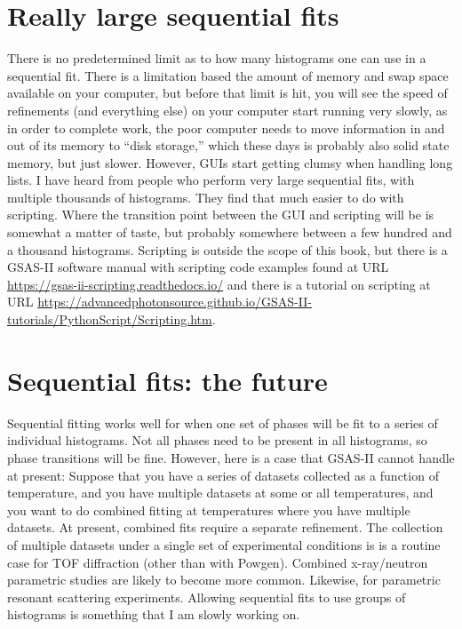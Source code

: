 \section{Really large sequential fits}
There is no predetermined limit as to how many histograms one can use in a sequential fit. There is a limitation based the amount of memory and swap space available on your computer, but before that limit is hit, you will see the speed of refinements (and everything else) on your computer start running very slowly, as in order to complete work, the poor computer needs to move information in and out of its memory to ``disk storage,'' which these days is probably also solid state memory, but just slower. However, GUIs start getting clumsy when handling long lists. I have heard from people who perform very large sequential fits, with multiple thousands of histograms. They find that much easier to do with scripting. Where the transition point between the GUI and scripting will be is somewhat a matter of taste, but probably somewhere between a few hundred and a thousand histograms. Scripting is outside the scope of this book, but there is a GSAS-II software manual with scripting code examples found at URL \url{https://gsas-ii-scripting.readthedocs.io/} and there is a tutorial on scripting at URL \url{https://advancedphotonsource.github.io/GSAS-II-tutorials/PythonScript/Scripting.htm}.

\section{Sequential fits: the future}
Sequential fitting works well for when one set of phases will be fit to a series of individual histograms. Not all phases need to be present in all histograms, so phase transitions will be fine. However, here is a case that GSAS-II cannot handle at present: Suppose that you have a series of datasets collected as a function of temperature, and you have multiple datasets at some or all temperatures, and you want to do combined fitting at temperatures where you have multiple datasets. At present, combined fits require a separate refinement. The collection of multiple datasets under a single set of experimental conditions is is a routine case for TOF diffraction (other than with Powgen). Combined x-ray/neutron parametric studies are likely to become more common. Likewise, for parametric resonant scattering experiments. Allowing sequential fits to use groups of histograms is something that I am slowly working on. 

